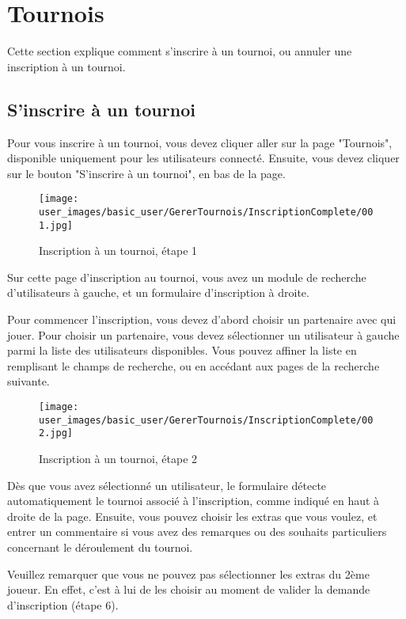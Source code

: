 \section{Tournois}

Cette section explique comment s'inscrire à un tournoi, ou annuler une inscription à un tournoi.

\subsection{S'inscrire à un tournoi}

Pour vous inscrire à un tournoi, vous devez cliquer aller sur la page "Tournois", disponible uniquement pour les utilisateurs connecté. Ensuite, vous devez cliquer sur le bouton "S'inscrire à un tournoi", en bas de la page.

\begin{figure}[H]
\centering
\texttt{[image: user\_images/basic\_user/GererTournois/InscriptionComplete/001.jpg]}
\caption{Inscription à un tournoi, étape 1}
\end{figure}

Sur cette page d'inscription au tournoi, vous avez un module de recherche d'utilisateurs à gauche, et un formulaire d'inscription à droite. \newline

Pour commencer l'inscription, vous devez d'abord choisir un partenaire avec qui jouer. Pour choisir un partenaire, vous devez sélectionner un utilisateur à gauche parmi la liste des utilisateurs disponibles. Vous pouvez affiner la liste en remplisant le champs de recherche, ou en accédant aux pages de la recherche suivante.\newline

\begin{figure}[H]
\centering
\texttt{[image: user\_images/basic\_user/GererTournois/InscriptionComplete/002.jpg]}
\caption{Inscription à un tournoi, étape 2}
\end{figure}

Dès que vous avez sélectionné un utilisateur, le formulaire détecte automatiquement le tournoi associé à l'inscription, comme indiqué en haut à droite de la page. Ensuite, vous pouvez choisir les extras que vous voulez, et entrer un commentaire si vous avez des remarques ou des souhaits particuliers concernant le déroulement du tournoi.\newline

Veuillez remarquer que vous ne pouvez pas sélectionner les extras du 2ème joueur. En effet, c'est à lui de les choisir au moment de valider la demande d'inscription (étape 6).

